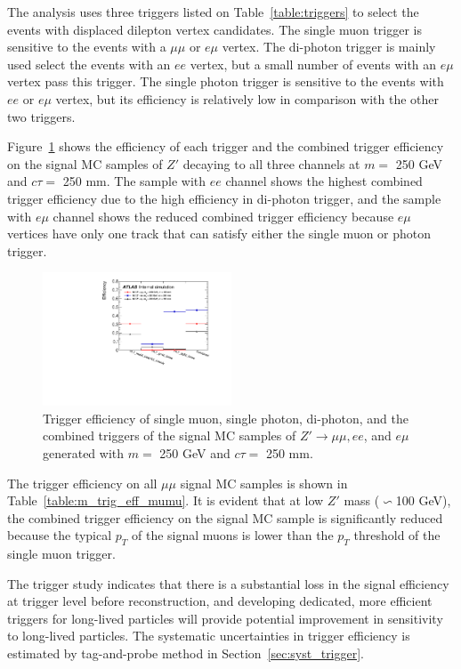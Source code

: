 The analysis uses three triggers listed on Table~\ref{table:triggers} to select the events with displaced dilepton vertex candidates. The single muon trigger is sensitive to the events with a $\mu\mu$ or $e\mu$ vertex. The di-photon trigger is mainly used select the events with an $ee$ vertex, but a small number of events with an $e\mu$ vertex pass this trigger. The single photon trigger is sensitive to the events with $ee$ or $e\mu$ vertex, but its efficiency is relatively low in comparison with the other two triggers.

 Figure~\ref{fig:m_trig_eff_allchannel} shows the efficiency of each trigger and the combined trigger efficiency on the signal MC samples of $Z'$ decaying to all three channels at $m = $ 250 GeV and $c\tau=$ 250 mm. The sample with $ee$ channel shows the highest combined trigger efficiency due to the high efficiency in di-photon trigger, and the sample with $e\mu$ channel shows the reduced combined trigger efficiency because $e\mu$ vertices have only one track that can satisfy either the single muon or photon trigger.

\begin{figure}[!htb]
	\includegraphics[width=0.50\textwidth]{figures/m_dv_eff_trig_allchannel.pdf}
	\centering
	\caption{Trigger efficiency of single muon, single photon, di-photon, and the combined triggers of the signal MC samples of $Z'\rightarrow\mu\mu, ee$, and $e\mu$ generated with $m=$ 250 GeV and $c\tau=$ 250 mm.}
	\label{fig:m_trig_eff_allchannel}
\end{figure}

The trigger efficiency on all $\mu\mu$ signal MC samples is shown in Table~\ref{table:m_trig_eff_mumu}. It is evident that at low $Z'$ mass ($\backsim$100 GeV), the combined trigger efficiency on the signal MC sample is significantly reduced because the typical $p_{T}$ of the signal muons is lower than the $p_{T}$ threshold of the single muon trigger.

The trigger study indicates that there is a substantial loss in the signal efficiency at trigger level before reconstruction, and developing dedicated, more efficient triggers for long-lived particles will provide potential improvement in sensitivity to long-lived particles. The systematic uncertainties in trigger efficiency is estimated by tag-and-probe method in Section~\ref{sec:syst_trigger}.

